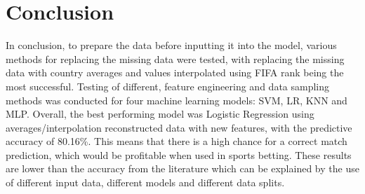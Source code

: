 \documentclass[8pt]{article}
\begin{document}
\section{Conclusion}
In conclusion, to prepare the data before inputting it into the model, various methods for replacing the missing data were tested, with replacing the missing data with country averages and values interpolated using FIFA rank being the most successful.
Testing of different, feature engineering and data sampling methods was conducted for four machine learning models: SVM, LR, KNN and MLP.
Overall, the best performing model was Logistic Regression using averages/interpolation reconstructed data with new features, with the predictive accuracy of 80.16\%. This means that there is a high chance for a correct match prediction, which would be profitable when used in sports betting. These results are lower than the accuracy from the literature which can be explained by the use of different input data, different models and different data splits.

  
\end{document}
